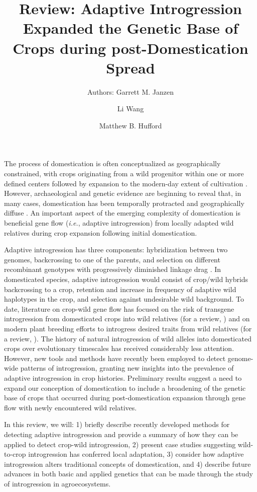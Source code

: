 \documentclass[11pt]{article}
\title{Review: Adaptive Introgression Expanded the Genetic Base of Crops during post-Domestication Spread}
\author[1]{Authors: Garrett M. Janzen}%
\author[1]{Li Wang}
\author[1,*]{Matthew B. Hufford}
\affil[1]{Department of Ecology, Evolution, and Organismal Biology, Iowa State University, Ames, Iowa, USA}
\affil[*]{Correspondence: mhufford@iastate.edu (M.B. Hufford)}
\date{}
\begin{document}
\maketitle



The process of domestication is often conceptualized as geographically constrained, with crops originating from a wild progenitor within one or more defined centers followed by expansion to the modern-day extent of cultivation \cite{Harlan1992}.
However, archaeological and genetic evidence are beginning to reveal that, in many cases, domestication has been temporally protracted and geographically diffuse \cite{brown2009complex, Meyer2016, wang2017, zhou2017, Fuller2014}.
An important aspect of the emerging complexity of domestication is beneficial gene flow (\emph{i.e.}, adaptive introgression) from locally adapted wild relatives during crop expansion following initial domestication.


Adaptive introgression has three components: hybridization between two genomes, backcrossing to one of the parents, and selection on different recombinant genotypes with progressively diminished linkage drag \cite{barton2001role, Feuillet200824}.
In domesticated species, adaptive introgression would consist of crop/wild hybrids backcrossing to a crop, retention and increase in frequency of adaptive wild haplotypes in the crop, and selection against undesirable wild background.
To date, literature on crop-wild gene flow has focused on the risk of transgene introgression from domesticated crops into wild relatives (for a review, \cite{stewart2003transgene}) and on modern plant breeding efforts to introgress desired traits from wild relatives (for a review, \cite{Dempewolf2017}).
The history of natural introgression of wild alleles into domesticated crops over evolutionary timescales has received considerably less attention.
However, new tools and methods have recently been employed to detect genome-wide patterns of introgression, granting new insights into the prevalence of adaptive introgression in crop histories.
Preliminary results suggest a need to expand our conception of domestication to include a broadening of the genetic base of crops that occurred during post-domestication expansion through gene flow with newly encountered wild relatives.


In this review, we will: 1) briefly describe recently developed methods for detecting adaptive introgression and provide a summary of how they can be applied to detect crop-wild introgression, 2) present case studies suggesting wild-to-crop introgression has conferred local adaptation, 3) consider how adaptive introgression alters traditional concepts of domestication, and 4) describe future advances in both basic and applied genetics that can be made through the study of introgression in agroecosystems.
\end{document}

